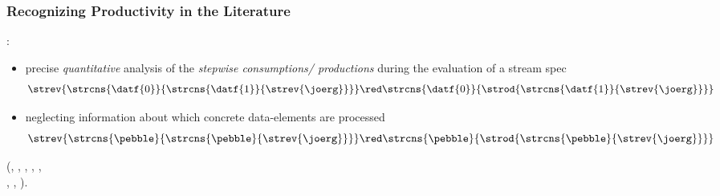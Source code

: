 \documentclass[10pt]{beamer}
\begin{document}
\begin{frame}%
  \frametitle{Recognizing Productivity in the Literature}

    :
    \\[1ex]
    \begin{itemize}
      \item precise \emph{quantitative} analysis of the 
        \emph{stepwise consumptions/ productions}
        during the evaluation of a stream spec
        \vspace*{0.25ex}
        \begin{equation*}
          \strev{\strcns{\datf{0}}{\strcns{\datf{1}}{\strev{\joerg}}}}
            \red
          \strcns{\datf{0}}{\strod{\strcns{\datf{1}}{\strev{\joerg}}}} 
        \end{equation*}
      \item \alert{neglecting information about 
                   which concrete data-elements are processed}
        \vspace*{0.25ex}
        \begin{equation*}
          \strev{\strcns{\pebble}{\strcns{\pebble}{\strev{\joerg}}}}
            \red
           \strcns{\pebble}{\strod{\strcns{\pebble}{\strev{\joerg}}}} 
        \end{equation*}
    \end{itemize}
    (, 
     , 
     ,  
     , 
     ,\\ \hspace*{\fill}%
     ,
     ,
     ).

\end{frame}
\end{document}
